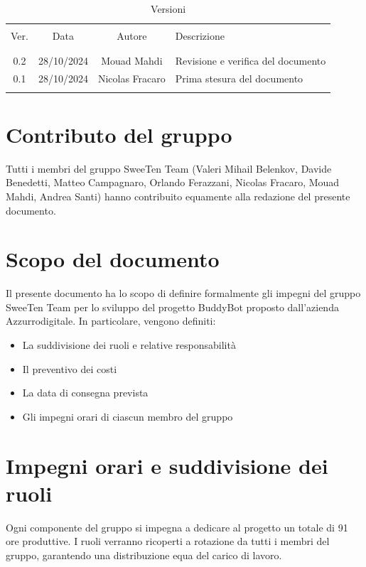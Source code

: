 \documentclass[italian, 12pt]{article}
\begin{document}
\pagestyle{mystyle}


\begin{table}[!h]
	\caption{Versioni}
	\begin{center}
		\begin{tabular}{ c c c p{9cm}}
			\hline \\[-2ex]
			Ver. & Data & Autore & Descrizione \\
			\\[-2ex] \hline \\[-1.5ex]
			0.2 & 28/10/2024 & Mouad Mahdi & Revisione e verifica del documento\\
			0.1 & 28/10/2024 & Nicolas Fracaro& Prima stesura del documento\\
			\\[-1.5ex] \hline
		\end{tabular}
	\end{center}
\end{table}
\section*{Contributo del gruppo}
\noindent Tutti i membri del gruppo SweeTen Team (Valeri Mihail Belenkov, Davide Benedetti, Matteo Campagnaro, Orlando Ferazzani, Nicolas Fracaro, Mouad Mahdi, Andrea Santi) hanno contribuito equamente alla redazione del presente documento.
\newpage

\tableofcontents
\newpage


\section{Scopo del documento}
Il presente documento ha lo scopo di definire formalmente gli impegni del gruppo SweeTen Team per lo sviluppo del progetto BuddyBot proposto dall'azienda Azzurrodigitale. In particolare, vengono definiti:
\begin{itemize}
    \item La suddivisione dei ruoli e relative responsabilità
    \item Il preventivo dei costi
    \item La data di consegna prevista
    \item Gli impegni orari di ciascun membro del gruppo
\end{itemize}

\section{Impegni orari e suddivisione dei ruoli}
Ogni componente del gruppo si impegna a dedicare al progetto un totale di 91 ore produttive. I ruoli verranno ricoperti a rotazione da tutti i membri del gruppo, garantendo una distribuzione equa del carico di lavoro.
\end{document}
